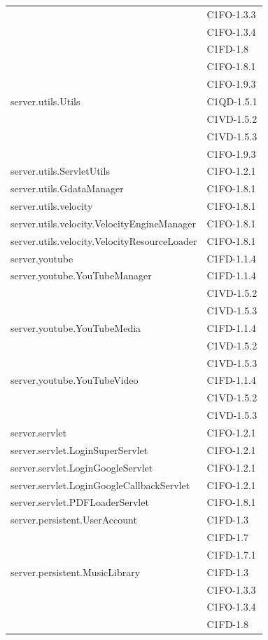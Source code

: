 \begin{footnotesize}
\begin{longtable}[!h]{|l|l|}
& C1FO-1.3.3\\
& C1FO-1.3.4\\
& C1FD-1.8\\
& C1FO-1.8.1\\
& C1FO-1.9.3\\\hline  
server.utils.Utils  & C1QD-1.5.1\\
& C1VD-1.5.2\\
& C1VD-1.5.3\\
& C1FO-1.9.3\\\hline 
server.utils.ServletUtils  &  C1FO-1.2.1 \\\hline
server.utils.GdataManager & C1FO-1.8.1 \\\hline
server.utils.velocity & C1FO-1.8.1 \\\hline
server.utils.velocity.VelocityEngineManager & C1FO-1.8.1 \\\hline
server.utils.velocity.VelocityResourceLoader & C1FO-1.8.1 \\\hline
server.youtube  &  C1FD-1.1.4 \\\hline
server.youtube.YouTubeManager  &  C1FD-1.1.4 \\
& C1VD-1.5.2\\
& C1VD-1.5.3\\\hline
server.youtube.YouTubeMedia  &  C1FD-1.1.4 \\
& C1VD-1.5.2\\
& C1VD-1.5.3\\\hline
server.youtube.YouTubeVideo  &  C1FD-1.1.4 \\
& C1VD-1.5.2\\
& C1VD-1.5.3\\\hline
server.servlet  &  C1FO-1.2.1 \\\hline 
server.servlet.LoginSuperServlet  &  C1FO-1.2.1 \\\hline 
server.servlet.LoginGoogleServlet  &  C1FO-1.2.1 \\\hline 
server.servlet.LoginGoogleCallbackServlet  &  C1FO-1.2.1 \\\hline
server.servlet.PDFLoaderServlet & C1FO-1.8.1 \\\hline  
server.persistent.UserAccount  &  C1FD-1.3\\
& C1FD-1.7\\
& C1FD-1.7.1\\\hline 
server.persistent.MusicLibrary  &  C1FD-1.3 \\
& C1FO-1.3.3\\
& C1FO-1.3.4\\
& C1FD-1.8\\

\end{longtable}
\end{footnotesize}
